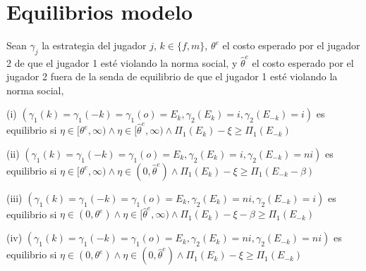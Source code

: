 \section{Equilibrios modelo}

\begin{framed}
\noindent Sean $\gamma_j$ la estrategia del jugador $j$, $k \in \{f,m\}$,  $\theta^e$ el costo esperado por el jugador 2 de que el jugador 1 esté violando la norma social, y $\hat{\theta}^e$ el costo esperado por el jugador 2 fuera de la senda de equilibrio de que el jugador 1 esté violando la norma social,

\noindent (i) $(\gamma_1(k)=\gamma_1(-k)=\gamma_1(o)=E_k, \gamma_2(E_k)=i, \gamma_2(E_{-k})=i)$ es equilibrio si $\eta\in[\theta^e, \infty) \wedge \eta\in[\hat{\theta}^e, \infty) \wedge \Pi_1(E_{k})- \xi \geq \Pi_1(E_{-k})$

\noindent (ii) $(\gamma_1(k)=\gamma_1(-k)=\gamma_1(o)=E_k, \gamma_2(E_k)=i, \gamma_2(E_{-k})=ni)$ es equilibrio si $\eta\in[\theta^e, \infty) \wedge \eta\in (0, \hat{\theta}^e) \wedge \Pi_1(E_{k})- \xi \geq \Pi_1(E_{-k}-\beta)$

\noindent (iii) $(\gamma_1(k)=\gamma_1(-k)=\gamma_1(o)=E_k, \gamma_2(E_k)=ni, \gamma_2(E_{-k})=i)$ es equilibrio si $\eta\in (0, \theta^e) \wedge \eta\in[\hat{\theta}^e, \infty) \wedge \Pi_1(E_{k})- \xi -\beta \geq \Pi_1(E_{-k})$

\noindent (iv) $(\gamma_1(k)=\gamma_1(-k)=\gamma_1(o)=E_k, \gamma_2(E_k)=ni, \gamma_2(E_{-k})=ni)$ es equilibrio si $\eta\in (0, \theta^e) \wedge \eta\in(0, \hat{\theta}^e) \wedge \Pi_1(E_{k})- \xi \geq \Pi_1(E_{-k})$
\end{framed}

